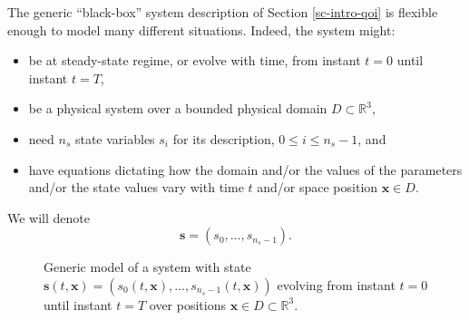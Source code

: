 The generic ``black-box'' system description of Section \ref{sc-intro-qoi} is flexible enough to model many different situations. Indeed, the system might:
\begin{itemize}
\item be at steady-state regime, or evolve with time, from instant $t=0$ until instant $t=T$,
\item be a physical system over a bounded physical domain $D\subset\mathbb{R}^3$,
\item need $n_{s}$ state variables $s_i$ for its description, $0\leqslant i\leqslant n_{s}-1$, and
\item have equations dictating how the domain and/or the values of the parameters and/or the state values vary with time $t$ and/or space position $\mathbf{x}\in D$.
\end{itemize}
We will denote
\begin{equation*}
\mathbf{s} = (s_0,\ldots,s_{n_s-1}).
\end{equation*}

\begin{figure}[h]
\caption{Generic model of a system with state $\mathbf{s}(t,\mathbf{x}) = (s_0(t,\mathbf{x}),\ldots,s_{n_s-1}(t,\mathbf{x}))$
evolving from instant $t=0$ until instant $t=T$
over positions $\mathbf{x}\in D\subset\mathbb{R}^3$.}
\label{fig-state-model}
\end{figure}

